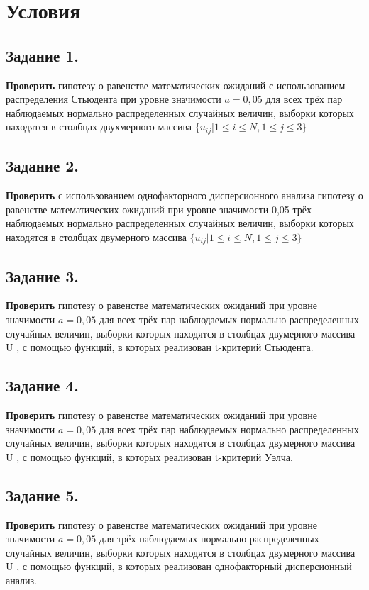 \section{Условия}
\label{cha:tasks}

\subsection{Задание 1.} 
\textbf{Проверить} гипотезу о равенстве математических ожиданий с использованием распределения 
Стьюдента при уровне значимости $a=0,05$ 
для всех трёх пар наблюдаемых нормально распределенных случайных величин, 
выборки которых находятся в столбцах двухмерного массива 
$\{ u_{ij} | 1 \le i \le N, 1 \le j \le 3 \}$
    
\subsection{Задание 2.} 
\textbf{Проверить} с использованием однофакторного дисперсионного анализа
гипотезу о равенстве математических ожиданий при уровне значимости 0,05
трёх наблюдаемых нормально распределенных случайных величин, выборки
которых находятся в столбцах двумерного массива $\{ u_{ij} | 1 \le i \le N, 1 \le j \le 3 \}$

\subsection{Задание 3.}
\textbf{Проверить} гипотезу о равенстве математических ожиданий при уровне
значимости $a = 0,05$ для всех трёх пар наблюдаемых нормально
распределенных случайных величин, выборки которых находятся в столбцах
двумерного массива U , с помощью функций, в которых реализован t-критерий
Стьюдента.

\subsection{Задание 4.}
\textbf{Проверить} гипотезу о равенстве математических ожиданий при уровне
значимости $a=0,05$ для всех трёх пар наблюдаемых нормально
распределенных случайных величин, выборки которых находятся в столбцах
двумерного массива U , с помощью функций, в которых реализован t-критерий
Уэлча.


\subsection{Задание 5.}
\textbf{Проверить} гипотезу о равенстве математических ожиданий при уровне
значимости $a=0,05$ для трёх наблюдаемых нормально распределенных
случайных величин, выборки которых находятся в столбцах двумерного
массива U , с помощью функций, в которых реализован однофакторный
дисперсионный анализ.


